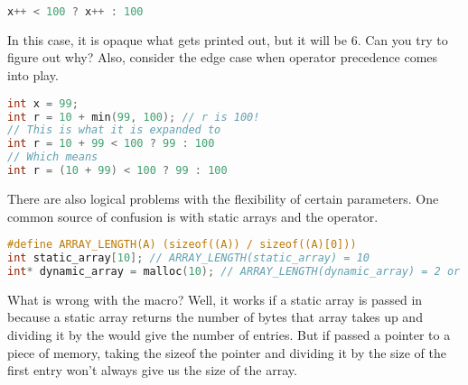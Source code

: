 \begin{lstlisting}[language=C]
x++ < 100 ? x++ : 100
\end{lstlisting}

In this case, it is opaque what gets printed out, but it will be 6.
Can you try to figure out why?
Also, consider the edge case when \gls{operator precedence} comes into play.

\begin{lstlisting}[language=C]
int x = 99;
int r = 10 + min(99, 100); // r is 100!
// This is what it is expanded to
int r = 10 + 99 < 100 ? 99 : 100
// Which means
int r = (10 + 99) < 100 ? 99 : 100
\end{lstlisting}

There are also logical problems with the flexibility of certain parameters.
One common source of confusion is with static arrays and the  operator.

\begin{lstlisting}[language=C]
#define ARRAY_LENGTH(A) (sizeof((A)) / sizeof((A)[0]))
int static_array[10]; // ARRAY_LENGTH(static_array) = 10
int* dynamic_array = malloc(10); // ARRAY_LENGTH(dynamic_array) = 2 or 1 consistently
\end{lstlisting}

What is wrong with the macro?
Well, it works if a \gls{static array} is passed in because  a static array returns the number of bytes that array takes up and dividing it by the  would give the number of entries.
But if passed a pointer to a piece of memory, taking the sizeof the pointer and dividing it by the size of the first entry won't always give us the size of the array.

